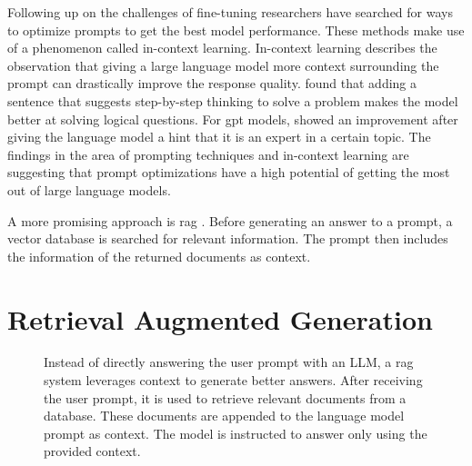 \documentclass[../main.tex]{subfiles}
\begin{document}
Following up on the challenges of fine-tuning researchers have searched for ways to optimize prompts to get the best model performance.
These methods make use of a phenomenon called in-context learning.
In-context learning describes the observation that giving a large language model more context surrounding the prompt can drastically improve the response quality.
\cite{Wei2022} found that adding a sentence that suggests step-by-step thinking to solve a problem makes the model better at solving logical questions.
For \gls{gpt} models, \autocite{Xu2023} showed an improvement after giving the language model a hint that it is an expert in a certain topic.
The findings in the area of prompting techniques and in-context learning are suggesting
that prompt optimizations have a high potential of getting the most out of large language models.

A more promising approach is \gls{rag} \cite{Lewis2020}.
Before generating an answer to a prompt, a vector database is searched for relevant information.
The prompt then includes the information of the returned documents as context.

\section{Retrieval Augmented Generation}

\begin{figure}[t]
    \centering
    \caption{Instead of directly answering the user prompt with an LLM,
        a \gls{rag} system leverages context to generate better answers.
        After receiving the user prompt, it is used to retrieve relevant documents from a database.
        These documents are appended to the language model prompt as context.
        The model is instructed to answer only using the provided context.}
    \label{fig:rag_flowchart}
\end{figure}
\end{document}
